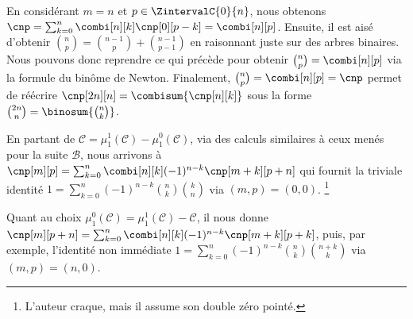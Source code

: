 En considérant $m = n$ et $p \in \ZintervalC{0}{n}$,
nous obtenons
$\cnp = \sum_{k=0}^n \combi[n][k] \cnp[0][p-k] = \combi[n][p]$.
%
Ensuite,
il est aisé d'obtenir
$\binom{n}{p} = \binom{n-1}{p} + \binom{n-1}{p-1}$
en raisonnant juste sur des arbres binaires.
%
Nous pouvons donc reprendre ce qui précède pour obtenir $\binom{n}{p} = \combi[n][p]$ via la formule du binôme de Newton.
%
Finalement,
$\binom{n}{p} = \combi[n][p] = \cnp$
permet de réécrire
$\cnp[2n][n] = \combisum{\cnp[n][k]}$
sous la forme
$\binom{2n}{n} = \binosum{\binom{n}{k}}$.




\begin{remark}
	En partant de
	$\mathcal{C} = \mu_1^1(\mathcal{C}) - \mu_1^0(\mathcal{C})$,
	via des calculs similaires à ceux menés pour la suite $\mathcal{B}$,
	nous arrivons à
    $\cnp[m][p] = \sum_{k=0}^n \combi[n][k] (-1)^{n-k} \cnp[m+k][p+n]$
    qui fournit la triviale identité
    $1 = \sum_{k=0}^n (-1)^{n-k} \binom{n}{k} \binom{k}{n}$
    via $(m,p) = (0,0)$.%
    \footnote{
    	L'auteur craque, mais il assume son double zéro pointé.
	}


    Quant au choix
	$\mu_1^0(\mathcal{C}) = \mu_1^1(\mathcal{C}) - \mathcal{C}$,
	il nous donne
    $\cnp[m][p+n] = \sum_{k=0}^n \combi[n][k] (-1)^{n-k} \cnp[m+k][p+k]$,
    puis, par exemple, l'identité non immédiate
    $1 = \sum_{k=0}^n (-1)^{n-k} \binom{n}{k} \binom{n+k}{k}$
    via $(m,p) = (n,0)$.
\end{remark}
